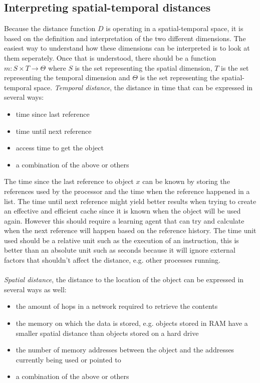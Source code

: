 \documentclass[pdftex,a4paper,12pt,twoside]{report}
\begin{document}
\subsection{Interpreting spatial-temporal distances}
Because the distance function $D$ is operating in a spatial-temporal space, it is based on the definition and interpretation of the two different dimensions.
The easiest way to understand how these dimensions can be interpreted is to look at them seperately. Once that is understood, there should be a function
$m : S \times T \to \Theta$ where $S$ is the set representing the spatial dimension, $T$ is the set representing the temporal dimension and $\Theta$ is the set representing the spatial-temporal space.
\newpage
\emph{Temporal distance}, the distance in time that can be expressed in several ways:
\begin{itemize}
\item time since last reference
\item time until next reference
\item access time to get the object
\item a combination of the above or others
\end{itemize}
The time since the last reference to object $x$ can be known by storing the references used by the processor and the time when the reference happened in a list. The time until next reference might yield better results when trying to create an effective and efficient cache since it is known when the object will be used again. However this should require a learning agent that can try and calculate when the next reference will happen based on the reference history. The time unit used should be a relative unit such as the execution of an instruction, this is better than an absolute unit such as seconds because it will ignore external factors that shouldn't affect the distance, e.g. other processes running.
\\\\
\emph{Spatial distance}, the distance to the location of the object can be expressed in several ways as well:
\begin{itemize}
\item the amount of hops in a network required to retrieve the contents
\item the memory on which the data is stored, e.g. objects stored in RAM have a smaller spatial distance than objects stored on a hard drive
\item the number of memory addresses between the object and the addresses currently being used or pointed to
\item a combination of the above or others
\end{itemize}
\end{document}
